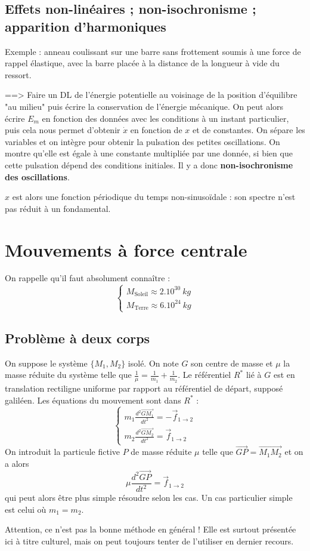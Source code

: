 \documentclass[french]{book}
\theoremstyle{plain}
\theoremstyle{definition}
\theoremstyle{remark}
\newcommand{\st}{^*}
\begin{document}
\subsection{Effets non-linéaires ; non-isochronisme ; apparition d'harmoniques}
Exemple : anneau coulissant sur une barre sans frottement soumis à une force de rappel élastique, avec la barre placée à la distance de la longueur à vide du ressort. \\ \par ==> Faire un DL de l'énergie potentielle au voisinage de la position d'équilibre "au milieu" puis écrire la conservation de l'énergie mécanique. On peut alors écrire $E_m$ en fonction des données avec les conditions à un instant particulier, puis cela nous permet d'obtenir $\dot{x}$ en fonction de $x$ et de constantes. On sépare les variables et on intègre pour obtenir la pulsation des petites oscillations. On montre qu'elle est égale à une constante multipliée par une donnée, si bien que cette pulsation dépend des conditions initiales. Il y a donc \textbf{non-isochronisme des oscillations}. \\ \par $x$ est alors une fonction périodique du temps non-sinusoïdale : son spectre n'est pas réduit à un fondamental.
\section{Mouvements à force centrale}
On rappelle qu'il faut absolument connaître : $$\begin{cases}
	M_{\text{Soleil}}\approx 2.10^{30}\ kg\\
	M_{\text{Terre}}\approx 6.10^{24}\ kg
\end{cases}$$
\subsection{Problème à deux corps}
On suppose le système $\{M_1,M_2\}$ isolé. On note $G$ son centre de masse et $\mu$ la masse réduite du système telle que $\displaystyle\frac{1}{\mu}=\frac{1}{m_1}+\frac{1}{m_2}$. Le référentiel $R\st$ lié à $G$ est en translation rectiligne uniforme par rapport au référentiel de départ, supposé galiléen. Les équations du mouvement sont dans $R\st$ : $$\begin{cases}
	\displaystyle m_1\frac{d^2\overrightarrow{GM_1}}{dt^2}=-\overrightarrow{f}_{1\to2}\\[4mm]
	\displaystyle m_2\frac{d^2\overrightarrow{GM_2}}{dt^2}=\overrightarrow{f}_{1\to2}
\end{cases}$$ On introduit la particule fictive $P$ de masse réduite $\mu$ telle que $\overrightarrow{GP}=\overrightarrow{M_1M_2}$ et on a alors $$\mu\frac{d^2\overrightarrow{GP}}{dt^2}=\overrightarrow{f}_{1\to2}$$ qui peut alors être plus simple résoudre selon les cas. Un cas particulier simple est celui où $m_1=m_2$. \\ \par Attention, ce n'est pas la bonne méthode en général ! Elle est surtout présentée ici à titre culturel, mais on peut toujours tenter de l'utiliser en dernier recours.
\end{document}
